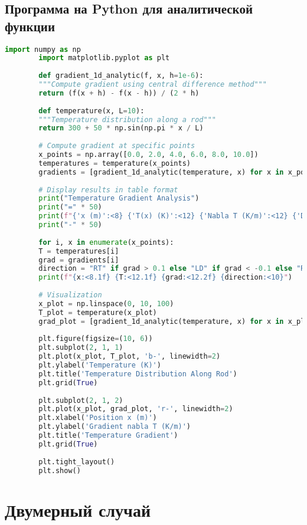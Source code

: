 \documentclass[12pt]{article}
\begin{document}
	\subsection{Программа на Python для аналитической функции}
	
	\lstset{style=pythonstyle}
	\begin{lstlisting}[language=Python, caption=Gradient computation in 1D (Python)]
		import numpy as np
		import matplotlib.pyplot as plt
		
		def gradient_1d_analytic(f, x, h=1e-6):
		"""Compute gradient using central difference method"""
		return (f(x + h) - f(x - h)) / (2 * h)
		
		def temperature(x, L=10):
		"""Temperature distribution along a rod"""
		return 300 + 50 * np.sin(np.pi * x / L)
		
		# Compute gradient at specific points
		x_points = np.array([0.0, 2.0, 4.0, 6.0, 8.0, 10.0])
		temperatures = temperature(x_points)
		gradients = [gradient_1d_analytic(temperature, x) for x in x_points]
		
		# Display results in table format
		print("Temperature Gradient Analysis")
		print("=" * 50)
		print(f"{'x (m)':<8} {'T(x) (K)':<12} {'Nabla T (K/m)':<12} {'Direction':<10}")
		print("-" * 50)
		
		for i, x in enumerate(x_points):
		T = temperatures[i]
		grad = gradients[i]
		direction = "RT" if grad > 0.1 else "LD" if grad < -0.1 else "R"
		print(f"{x:<8.1f} {T:<12.1f} {grad:<12.2f} {direction:<10}")
		
		# Visualization
		x_plot = np.linspace(0, 10, 100)
		T_plot = temperature(x_plot)
		grad_plot = [gradient_1d_analytic(temperature, x) for x in x_plot]
		
		plt.figure(figsize=(10, 6))
		plt.subplot(2, 1, 1)
		plt.plot(x_plot, T_plot, 'b-', linewidth=2)
		plt.ylabel('Temperature (K)')
		plt.title('Temperature Distribution Along Rod')
		plt.grid(True)
		
		plt.subplot(2, 1, 2)
		plt.plot(x_plot, grad_plot, 'r-', linewidth=2)
		plt.xlabel('Position x (m)')
		plt.ylabel('Gradient nabla T (K/m)')
		plt.title('Temperature Gradient')
		plt.grid(True)
		
		plt.tight_layout()
		plt.show()
	\end{lstlisting}
	
	\section{Двумерный случай}
	
\end{document}
